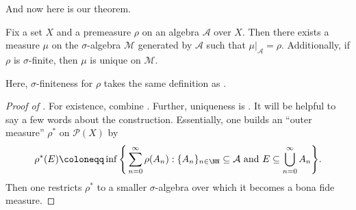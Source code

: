 \documentclass[../notes.tex]{subfiles}
\begin{document}
And now here is our theorem.
\begin{theorem}[Extension] \label{thm:extension}
	Fix a set $X$ and a premeasure $\rho$ on an algebra $\mathcal A$ over $X$. Then there exists a measure $\mu$ on the $\sigma$-algebra $\mathcal M$ generated by $\mathcal A$ such that $\mu|_{\mathcal A}=\rho$. Additionally, if $\rho$ is $\sigma$-finite, then $\mu$ is unique on $\mathcal M$.
\end{theorem}
Here, $\sigma$-finiteness for $\rho$ takes the same definition as .
\begin{proof}[Proof of ]
	For existence, combine \cite[Lemma~6.16 and Theorems~6.21, 6.24]{elber-top}. Further, uniqueness is \cite[Theorem~6.35]{elber-top}. It will be helpful to say a few words about the construction. Essentially, one builds an ``outer measure'' $\rho^*$ on $\mathcal P(X)$ by
	\[\rho^*(E)\coloneqq\inf\Bigg\{\sum_{n=0}^\infty\rho(A_n):\{A_n\}_{n\in\NN}\subseteq\mathcal A\text{ and }E\subseteq\bigcup_{n=0}^\infty A_n\Bigg\}.\]
	Then one restricts $\rho^*$ to a smaller $\sigma$-algebra over which it becomes a bona fide measure.
\end{proof}
\end{document}
